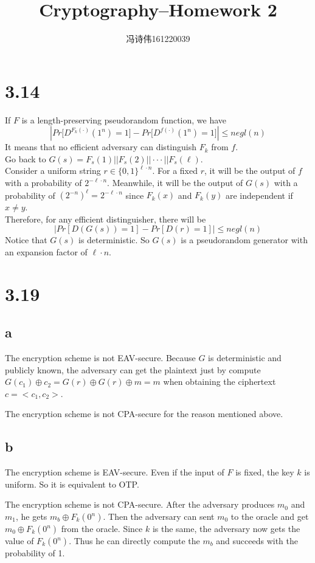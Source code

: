 \documentclass[a4papers]{ctexart}
\title{Cryptography--Homework 2}
\author{冯诗伟161220039}
\date{}
\begin{document}
\maketitle
\section*{3.14}
\noindent If $F$ is a length-preserving pseudorandom function, we have
 \[|Pr\big[ D^{F_k(·)}(1^n)=1\big] - Pr\big[ D^{f(·)}(1^n)=1\big]| \le negl(n)\]
 It means that no efficient adversary can distinguish $F_k$ from $f$.\\
 Go back to $G(s) =F_s(1)||F_s(2)||···||F_s(\ell)$. \\
 Consider a uniform string $r \in \{ 0,1 \}^{\ell·n}$. For a fixed $r$, it will be the output of $f$ with a probability of $2^{-\ell·n}$.
 Meanwhile, it will be the output of $G(s)$ with a probability of $(2^{-n})^\ell = 2^{-\ell·n}$ since $F_k(x)$ and $F_k(y)$ are independent if $x\ne y$.\\
 Therefore, for any efficient distinguisher, there will be 
 \[|Pr[D(G(s))=1]-Pr[D(r)=1]| \le negl(n)\]
 Notice that $G(s)$ is deterministic. So $G(s)$ is a pseudorandom generator with an expansion factor of $\ell·n$.

\section*{3.19}
\subsection*{a}
The encryption scheme is not EAV-secure. Because $G$ is deterministic and publicly known, the adversary can get the plaintext
just by compute $G(c_1)\oplus c_2 = G(r) \oplus G(r) \oplus m = m$ when obtaining the ciphertext $c=<c_1,c_2>$.

The encryption scheme is not CPA-secure for the reason mentioned above.

\subsection*{b}
The encryption scheme is EAV-secure. Even if the input of $F$ is fixed, the key $k$ is uniform. So it is equivalent to OTP.

The encryption scheme is not CPA-secure. After the adversary produces $m_0$ and $m_1$, he gets $m_b \oplus F_k(0^n)$. Then the adversary 
can sent $m_0$ to the oracle and get $m_0 \oplus F_k(0^n)$ from the oracle. Since $k$ is the same, the adversary now gets the value of $F_k(0^n)$. 
Thus he can directly compute the $m_b$ and succeeds with the probability of 1.
\end{document}
